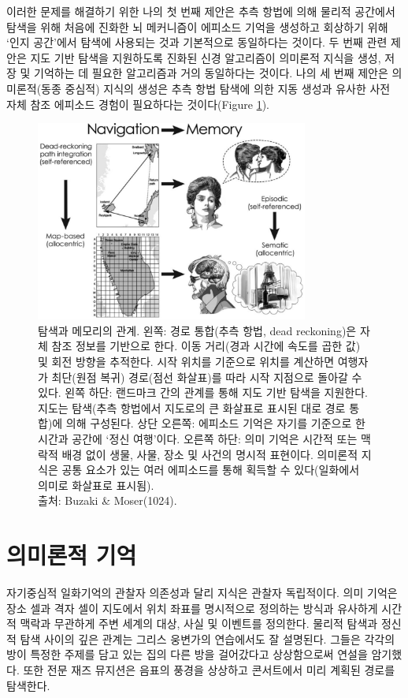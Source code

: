 \documentclass[openany]{book}
\begin{document}
\begin{appendices}
이러한 문제를 해결하기 위한 나의 첫 번째 제안은 추측 항법에 의해 물리적 공간에서 탐색을 위해 처음에 진화한 뇌 메커니즘이 에피소드 기억을 생성하고 회상하기 위해 `인지 공간’에서 탐색에 사용되는 것과 기본적으로 동일하다는 것이다. 두 번째 관련 제안은 지도 기반 탐색을 지원하도록 진화된 신경 알고리즘이 의미론적 지식을 생성, 저장 및 기억하는 데 필요한 알고리즘과 거의 동일하다는 것이다. 나의 세 번째 제안은 의미론적(동종 중심적) 지식의 생성은 추측 항법 탐색에 의한 지동 생성과 유사한 사전 자체 참조 에피소드 경험이 필요하다는 것이다(Figure \ref{fig:5_7}).
\begin{figure}[htb!]
  \centering
  \includegraphics[width=0.8\textwidth]{image/5_7}
  \caption{탐색과 메모리의 관계. 왼쪽: 경로 통합(추측 항법, dead reckoning)은 자체 참조 정보를 기반으로 한다. 이동 거리(경과 시간에 속도를 곱한 값) 및 회전 방향을 추적한다. 시작 위치를 기준으로 위치를 계산하면 여행자가 최단(원점 복귀) 경로(점선 화살표)를 따라 시작 지점으로 돌아갈 수 있다.
  왼쪽 하단: 랜드마크 간의 관계를 통해 지도 기반 탐색을 지원한다. 지도는 탐색(추측 항법에서 지도로의 큰 화살표로 표시된 대로 경로 통합)에 의해 구성된다.
상단 오른쪽: 에피소드 기억은 자기를 기준으로 한 시간과 공간에 `정신 여행'이다. 오른쪽 하단: 의미 기억은 시간적 또는 맥락적 배경 없이 생물, 사물, 장소 및 사건의 명시적 표현이다. 의미론적 지식은 공통 요소가 있는 여러 에피소드를 통해 획득할 수 있다(일화에서 의미로 화살표로 표시됨).\\출처: Buzaki \& Moser(1024).}
  \label{fig:5_7}
\end{figure}

\section{의미론적 기억}
자기중심적 일화기억의 관찰자 의존성과 달리 지식은 관찰자 독립적이다. 의미 기억은 장소 셀과 격자 셀이 지도에서 위치 좌표를 명시적으로 정의하는 방식과 유사하게 시간적 맥락과 무관하게 주변 세계의 대상, 사실 및 이벤트를 정의한다. 물리적 탐색과 정신적 탐색 사이의 깊은 관계는 그리스 웅변가의 연습에서도 잘 설명된다. 그들은 각각의 방이 특정한 주제를 담고 있는 집의 다른 방을 걸어갔다고 상상함으로써 연설을 암기했다. 또한 전문 재즈 뮤지션은 음표의 풍경을 상상하고 콘서트에서 미리 계획된 경로를 탐색한다.


\end{appendices}
\end{document}

